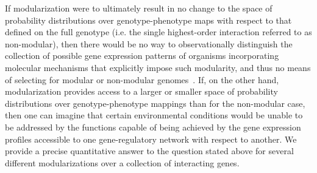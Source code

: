 If modularization were to ultimately result in no change to the space of probability distributions over genotype-phenotype maps with respect to that defined on the full genotype (i.e. the single highest-order interaction referred to as non-modular), then there would be no way to observationally distinguish the collection of possible gene expression patterns of organisms incorporating molecular mechanisms that explicitly impose such modularity, and thus no means of selecting for modular or non-modular genomes~\cite{Jothi2009,Colm}. If, on the other hand, modularization provides access to a larger or smaller space of probability distributions over genotype-phenotype mappings than for the non-modular case, then one can imagine that certain environmental conditions would be unable to be addressed by the functions capable of being achieved by the gene expression profiles accessible to one gene-regulatory network with respect to another. We provide a precise quantitative answer to the question stated above for several different modularizations over a collection of interacting genes.


